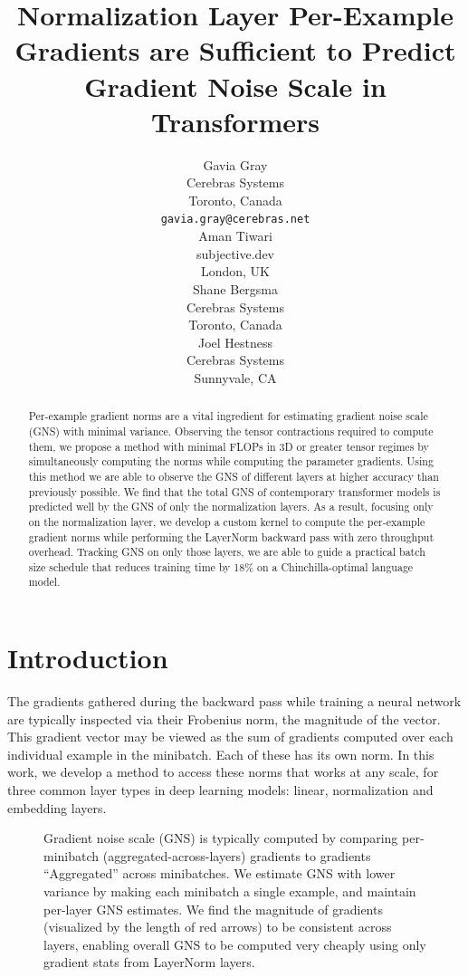 \documentclass{article}
\title{Normalization Layer Per-Example Gradients are Sufficient to Predict Gradient Noise Scale in Transformers}
\author{%
     Gavia Gray \\
     Cerebras Systems \\
     Toronto, Canada \\
     \texttt{gavia.gray@cerebras.net} \\
     \And
     Aman Tiwari \\
     subjective.dev \\
     London, UK \\
     \And
     Shane Bergsma \\
     Cerebras Systems \\
     Toronto, Canada \\
     \And
     Joel Hestness \\
     Cerebras Systems \\
     Sunnyvale, CA \\
}
\begin{document}
\maketitle

\begin{abstract}
    Per-example gradient norms are a vital ingredient for estimating gradient
    noise scale (GNS) with minimal variance. Observing the tensor contractions
    required to compute them, we propose a method with minimal FLOPs in 3D or
    greater tensor regimes by simultaneously computing the norms while computing
    the parameter gradients. Using this method we are able to observe the GNS of
    different layers at higher accuracy than previously possible. We find that
    the total GNS of contemporary transformer models is predicted well by the
    GNS of only the normalization layers. As a result, focusing only on the
    normalization layer, we develop a custom kernel to compute the per-example
    gradient norms while performing the LayerNorm backward pass with zero
    throughput overhead. Tracking GNS on only those layers, we are able to guide
    a practical batch size schedule that reduces training time by 18\% on
    a Chinchilla-optimal language model.

\end{abstract}

\section{Introduction}\label{introduction}

\vspace{-0.45em}



The gradients gathered during the backward pass while training a neural network
are typically inspected via their Frobenius norm, the magnitude of the vector.
This gradient vector may be viewed as the sum of gradients computed over each
individual example in the minibatch. Each of these has its own norm. In this work,
we develop a method to access these norms that works at any scale, for three
common layer types in deep learning models: linear, normalization and embedding
layers.

\begin{figure}
    \centering
    
    \caption{%
    Gradient noise scale (GNS) is typically computed by comparing per-minibatch
    (aggregated-across-layers) gradients to gradients ``Aggregated'' across
    minibatches.  We estimate GNS with lower variance by making each minibatch
    a single example, and maintain per-layer GNS estimates.  We find the
    magnitude of gradients (visualized by the length of red arrows) to be
    consistent across layers, enabling overall GNS to be computed very cheaply
    using only gradient stats from LayerNorm layers.}
    \label{fig:diagram}  %
\end{figure}
\end{document}
